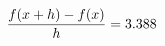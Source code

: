 \documentclass[preview]{standalone}
\begin{document}
\begin{align*}
\special{dvisvgm:raw <g id='unique000'>}\frac{f(x+h)-f(x)}{h} = 3.388\special{dvisvgm:raw </g>}
\end{align*}
\end{document}
